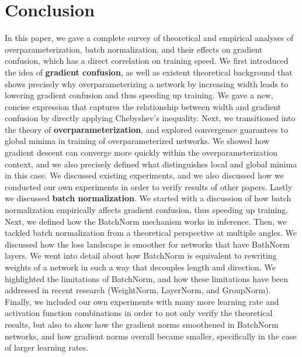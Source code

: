 \documentclass{article}
\begin{document}
\section{Conclusion}
In this paper, we gave a complete survey of theoretical and empirical analyses of overparameterization, batch normalization, and their effects on gradient confusion, which has a direct correlation on training speed. We first introduced the idea of \textbf{gradient confusion}, as well as existent theoretical background that shows precisely why overparameterizing a network by increasing width leads to lowering gradient confusion and thus speeding up training. We gave a new, concise expression that captures the relationship between width and gradient confusion by directly applying Chebyshev's inequality. Next, we transitioned into the theory of \textbf{overparameterization}, and explored convergence guarantees to global minima in training of overparameterized networks. We showed how gradient descent can converge more quickly within the overparameterization context, and we also precisely defined what distinguishes local and global minima in this case. We discussed existing experiments, and we also discussed how we conducted our own experiments in order to verify results of other papers. Lastly we discussed \textbf{batch normalization}. We started with a discussion of how batch normalization empirically affects gradient confusion, thus speeding up training. Next, we defined how the BatchNorm mechanism works in inference. Then, we tackled batch normalization from a theoretical perspective at multiple angles. We discussed how the loss landscape is smoother for networks that have BathNorm layers. We went into detail about how BatchNorm is equivalent to rewriting weights of a network in such a way that decouples length and direction. We highlighted the limitations of BatchNorm, and how these limitations have been addressed in recent research (WeightNorm, LayerNorm, and GroupNorm). Finally, we included our own experiments with many more learning rate and activation function combinations in order to not only verify the theoretical results, but also to show how the gradient norms smoothened in BatchNorm networks, and how gradient norms overall became smaller, specifically in the case of larger learning rates.

\newpage

\medskip

\small
\end{document}
